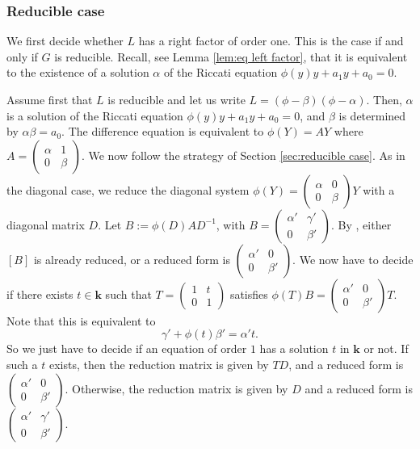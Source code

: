 \documentclass[a4paper,11pt]{amsart}
\def\k{\mathbf{k}}
\begin{document}
\subsubsection*{Reducible case}
We first decide whether $L$ has a right factor of order one.  This is the case if and only if $G$ is reducible.  Recall, see Lemma \ref{lem:eq left factor},  that it is equivalent to the existence of  a solution $\alpha$ of the Riccati equation $\phi(y)y+a_1y+a_0=0$. \par 
Assume first that $L$ is reducible and let us write $L=(\phi-\beta)(\phi-\alpha)$.  Then, $\alpha$ is a solution of the Riccati equation  $\phi(y)y+a_1y+a_0=0$, and $\beta$ is determined by $\alpha \beta=a_0$.  The difference equation is equivalent to $\phi(Y)=AY$ where $A=\left(\begin{array}{cc}
\alpha &  1\\
0 & \beta
\end{array}\right)
$. 
 We now follow the strategy of Section \ref{sec:reducible case}.  As in the diagonal case, we reduce the diagonal system $\phi(Y)=\left(\begin{array}{cc}
\alpha &  0\\
0 & \beta
\end{array}\right)Y
$ with a diagonal  matrix  $D$.  Let $B:=\phi(D)AD^{-1}$,  with $B=\left(\begin{array}{cc}
\alpha' &  \gamma'\\
0 & \beta'
\end{array}\right)$.   By \cite[Lemma 4.4]{hendriks1998algorithm}, either $[B]$ is already reduced, or a reduced form is $\left( \begin{array}{cc}
\alpha' &  0\\
0 & \beta'
\end{array}\right)$. 
We now have to decide if there exists $t\in \k$ such that $T=\left(\begin{array}{cc}
1 & t\\
0 & 1
\end{array}\right)$ satisfies $\phi(T)B=\left( \begin{array}{cc}
\alpha' &  0\\
0 & \beta'
\end{array}\right)T$.  Note that this is equivalent to 
$$  \gamma'+ \phi(t) \beta'= \alpha' t.$$
So we just have to decide if an equation of order $1$ has a solution $t$ in $\k$ or not.  
If such a $t$ exists,  then the reduction matrix is given by $TD$,  and a reduced form is $\left( \begin{array}{cc}
\alpha' &  0\\
0 & \beta'
\end{array}\right)$. Otherwise,  the reduction matrix is given by $D$ and a reduced form is $\left(\begin{array}{cc}
\alpha' &  \gamma'\\
0 & \beta'
\end{array}\right)$. \par 
\end{document}
